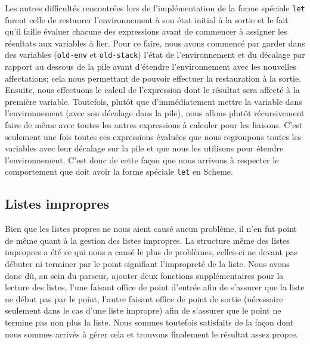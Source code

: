 \documentclass[12pt]{article}
\begin{document}
Les autres difficultés rencontrées lors de l'implémentation de la forme spéciale \texttt{let} furent celle de restaurer l'environnement à son état initial à la sortie et le fait qu'il faille évaluer chacune des expressions avant de commencer à assigner les résultats aux variables à lier. Pour ce faire, nous avons commencé par garder dans des variables (\texttt{old-env} et \texttt{old-stack}) l'état de l'environnement et du décalage par rapport au dessous de la pile avant d'étendre l'environnement avec les nouvelles affectations; cela nous permettant de pouvoir effectuer la restauration à la sortie. Ensuite, nous effectuons le calcul de l'expression dont le résultat sera affecté à la première variable. Toutefois, plutôt que d'immédiatement mettre la variable dans l'environnement (avec son décalage dans la pile), nous allons plutôt récursivement faire de même avec toutes les autres expressions à calculer pour les liaisons. C'est seulement une fois toutes ces expressions évaluées que nous regroupons toutes les variables avec leur décalage sur la pile et que nous les utilisons pour étendre l'environnement. C'est donc de cette façon que nous arrivons à respecter le comportement que doit avoir la forme spéciale \texttt{let} en Scheme.

\subsection{Listes impropres}
Bien que les listes propres ne nous aient causé aucun problème, il n'en fut point de même quant à la gestion des listes impropres. La structure même des listes impropres a été ce qui nous a causé le plus de problèmes, celles-ci ne devant pas débuter ni terminer par le point signifiant l'impropreté de la liste. Nous avons donc dû, au sein du parseur, ajouter deux fonctions supplémentaires pour la lecture des listes, l'une faisant office de point d'entrée afin de s'assurer que la liste ne début pas par le point, l'autre faisant office de point de sortie (nécessaire seulement dans le cas d'une liste impropre) afin de s'assurer que le point ne termine pas non plus la liste. Nous sommes toutefois satisfaits de la façon dont nous sommes arrivés à gérer cela et trouvons finalement le résultat assez propre.
\end{document}
